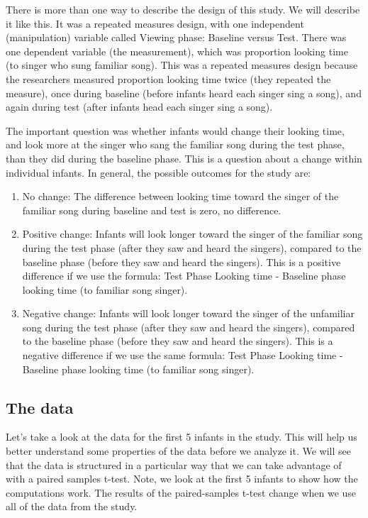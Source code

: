 \documentclass[
]{book}
\begin{document}
There is more than one way to describe the design of this study. We will describe it like this. It was a repeated measures design, with one independent (manipulation) variable called Viewing phase: Baseline versus Test. There was one dependent variable (the measurement), which was proportion looking time (to singer who sung familiar song). This was a repeated measures design because the researchers measured proportion looking time twice (they repeated the measure), once during baseline (before infants heard each singer sing a song), and again during test (after infants head each singer sing a song).

The important question was whether infants would change their looking time, and look more at the singer who sang the familiar song during the test phase, than they did during the baseline phase. This is a question about a change within individual infants. In general, the possible outcomes for the study are:

\begin{enumerate}
\def\labelenumi{\arabic{enumi}.}
\item
  No change: The difference between looking time toward the singer of the familiar song during baseline and test is zero, no difference.
\item
  Positive change: Infants will look longer toward the singer of the familiar song during the test phase (after they saw and heard the singers), compared to the baseline phase (before they saw and heard the singers). This is a positive difference if we use the formula: Test Phase Looking time - Baseline phase looking time (to familiar song singer).
\item
  Negative change: Infants will look longer toward the singer of the unfamiliar song during the test phase (after they saw and heard the singers), compared to the baseline phase (before they saw and heard the singers). This is a negative difference if we use the same formula: Test Phase Looking time - Baseline phase looking time (to familiar song singer).
\end{enumerate}

\subsection{The data}\label{the-data}

Let's take a look at the data for the first 5 infants in the study. This will help us better understand some properties of the data before we analyze it. We will see that the data is structured in a particular way that we can take advantage of with a paired samples t-test. Note, we look at the first 5 infants to show how the computations work. The results of the paired-samples t-test change when we use all of the data from the study.
\end{document}
